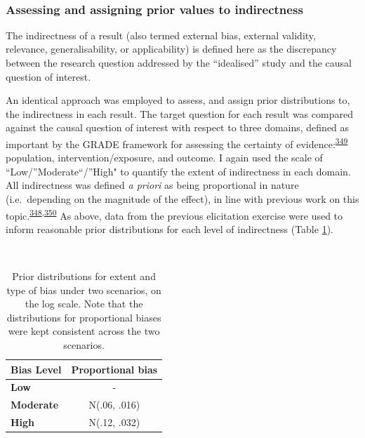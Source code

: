\documentclass[a4paper, twoside]{templates/ociamthesis}
\begin{document}
~

\hypertarget{assessing-and-assigning-prior-values-to-indirectness}{%
\subsubsection{Assessing and assigning prior values to indirectness}\label{assessing-and-assigning-prior-values-to-indirectness}}

The indirectness of a result (also termed external bias, external validity, relevance, generalisability, or applicability) is defined here as the discrepancy between the research question addressed by the ``idealised'' study and the causal question of interest.

An identical approach was employed to assess, and assign prior distributions to, the indirectness in each result. The target question for each result was compared against the causal question of interest with respect to three domains, defined as important by the GRADE framework for assessing the certainty of evidence:\textsuperscript{\protect\hyperlink{ref-guyatt2011}{349}} population, intervention/exposure, and outcome. I again used the scale of ``Low/''Moderate``/''High" to quantify the extent of indirectness in each domain. All indirectness was defined \emph{a priori} as being proportional in nature (i.e.~depending on the magnitude of the effect), in line with previous work on this topic.\textsuperscript{\protect\hyperlink{ref-turner2009}{348},\protect\hyperlink{ref-thompson2011}{350}} As above, data from the previous elicitation exercise were used to inform reasonable prior distributions for each level of indirectness (Table \ref{tab:priorsIndirect-table}).

~





\begin{table}[H]

\caption[Prior distributions mapped to different extents of bias.]{\label{tab:priorsIndirect-table}Prior distributions for extent and type of bias under two scenarios, on the log scale. Note that the distributions for proportional biases were kept consistent across the two scenarios.}
\centering
\begin{tabular}[t]{>{}lc}
\toprule
\textbf{Bias Level} & \textbf{Proportional bias}\\
\midrule
\textbf{Low} & -\\
\midrule
\textbf{Moderate} & N(.06, .016)\\
\midrule
\textbf{High} & N(.12, .032)\\
\bottomrule
\end{tabular}
\end{table}
\end{document}
